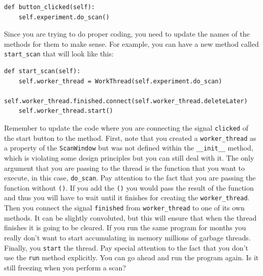 \begin{verbatim}
def button_clicked(self):
    self.experiment.do_scan()
\end{verbatim}

Since you are trying to do proper coding, you need to update the names
of the methods for them to make sense. For example, you can have a new
method called \texttt{start_scan} that will look like this:

\begin{verbatim}
def start_scan(self):
    self.worker_thread = WorkThread(self.experiment.do_scan)
    self.worker_thread.finished.connect(self.worker_thread.deleteLater)
    self.worker_thread.start()
\end{verbatim}

Remember to update the code where you are connecting the signal
\texttt{clicked} of the start button to the method. First, note that you
created a \texttt{worker_thread} as a property of the
\texttt{ScanWindow} but was not defined within the \texttt{__init__}
method, which is violating some design principles but you can still deal
with it. The only argument that you are passing to the thread is the
function that you want to execute, in this case, \texttt{do_scan}. Pay
attention to the fact that you are passing the function without
\texttt{()}. If you add the \texttt{()} you would pass the result of the
function and thus you will have to wait until it finishes for creating
the \texttt{worker\_thread}. Then you connect the signal
\texttt{finished} from \texttt{worker_thread} to one of its own
methods. It can be slightly convoluted, but this will ensure that when
the thread finishes it is going to be cleared. If you run the same
program for months you really don't want to start accumulating in memory
millions of garbage threads. Finally, you \texttt{start} the thread. Pay
special attention to the fact that you don't use the \texttt{run} method
explicitly. You can go ahead and run the program again. Is it still
freezing when you perform a scan?




